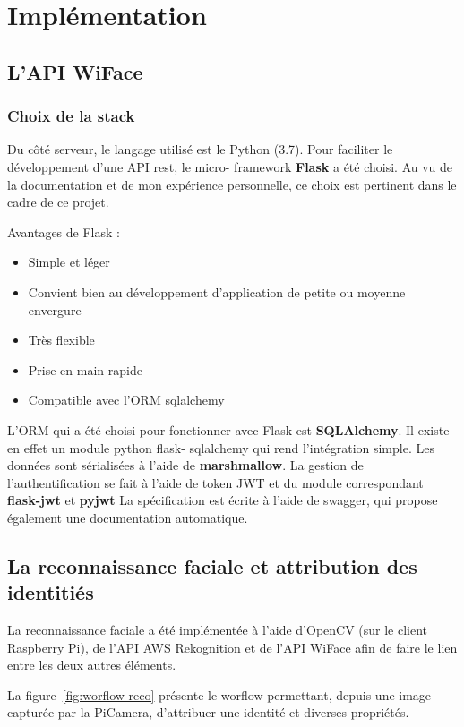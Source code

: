 \chapter{Implémentation}
\label{ch:implémentation}

\section{L'API WiFace}

\subsection{Choix de la stack}

Du côté serveur, le langage utilisé est le Python (3.7). Pour faciliter le développement d’une API rest, le micro-
framework \textbf{Flask} a été choisi. Au vu de la documentation et de mon expérience personnelle, ce choix est pertinent
dans le cadre de ce projet.

Avantages de Flask :
\begin{itemize}
\item Simple et léger
\item Convient bien au développement d’application de petite ou moyenne envergure
\item Très flexible
\item Prise en main rapide
\item Compatible avec l’ORM sqlalchemy
\end{itemize}

L’ORM qui a été choisi pour fonctionner avec Flask est \textbf{SQLAlchemy}. Il existe en effet un module python flask-
sqlalchemy qui rend l’intégration simple.
Les données sont sérialisées à l’aide de \textbf{marshmallow}.
La gestion de l’authentification se fait à l’aide de token JWT et du module correspondant \textbf{flask-jwt} et \textbf{pyjwt}
La spécification est écrite à l’aide de swagger, qui propose également une documentation automatique.

\section{La reconnaissance faciale et attribution des identitiés}

La reconnaissance faciale a été implémentée à l'aide d'OpenCV (sur le client Raspberry Pi), de l'API AWS Rekognition et de l'API WiFace
afin de faire le lien entre les deux autres éléments. 

La figure~\ref{fig:worflow-reco} présente le worflow permettant, depuis une image capturée par la PiCamera, d'attribuer une identité et diverses propriétés.

